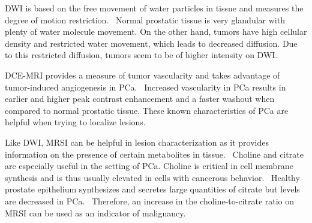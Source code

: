 DWI is based on the free movement of water particles in tissue and measures the
degree of motion restriction.~\cite{Koh2007} Normal prostatic tissue is very
glandular with plenty of water molecule movement. On the other hand, tumors
have high cellular density and restricted water movement, which leads to
decreased diffusion. Due to this restricted diffusion, tumors seem to be of
higher intensity on DWI.~\cite{Koh2007}

DCE-MRI provides a measure of tumor vascularity and takes advantage of
tumor-induced angiogenesis in PCa.~\cite{Noworolski2005} Increased vascularity
in PCa results in earlier and higher peak contrast enhancement and a faster
washout when compared to normal prostatic tissue. These known characteristics
of PCa are helpful when trying to localize lesions. 

Like DWI, MRSI can be helpful in lesion characterization as it provides
information on the presence of certain metabolites in
tissue.~\cite{Barentsz2012} Choline and citrate are especially useful in the
setting of PCa. Choline is critical in cell membrane synthesis and is thus
usually elevated in cells with cancerous behavior.~\cite{Gupta2013} Healthy
prostate epithelium synthesizes and secretes large quantities of citrate but
levels are decreased in PCa.~\cite{Costello1999,Kurhanewicz2002} Therefore, an
increase in the choline-to-citrate ratio on MRSI can be used as an indicator of
malignancy.~\cite{Bonekamp2011}
